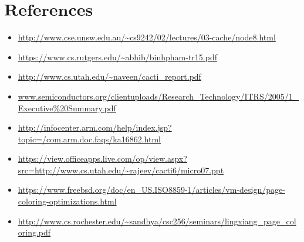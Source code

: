 \documentclass{tufte-handout}
\begin{document}
		\section{$\textbf{References}$}
		\begin{itemize}
			\item \url{http://www.cse.unsw.edu.au/~cs9242/02/lectures/03-cache/node8.html}
			\item \url{https://www.cs.rutgers.edu/~abhib/binhpham-tr15.pdf}
			\item \url{http://www.cs.utah.edu/~naveen/cacti_report.pdf}
			\item \url{www.semiconductors.org/clientuploads/Research_Technology/ITRS/2005/1_Executive\%20Summary.pdf}
			\item \url{http://infocenter.arm.com/help/index.jsp?topic=/com.arm.doc.faqs/ka16862.html}
			\item \url{https://view.officeapps.live.com/op/view.aspx?src=http://www.cs.utah.edu/~rajeev/cacti6/micro07.ppt}
			\item \url{https://www.freebsd.org/doc/en_US.ISO8859-1/articles/vm-design/page-coloring-optimizations.html}
			\item \url{http://www.cs.rochester.edu/~sandhya/csc256/seminars/lingxiang_page_coloring.pdf}
		\end{itemize}






  
  
  
  
\end{document}
